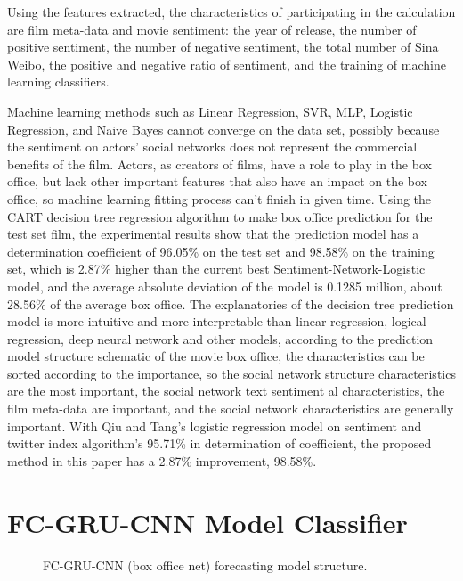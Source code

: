 \documentclass[review]{cvpr}
\begin{document}
Using the features extracted, the characteristics of participating in the calculation are film meta-data and movie sentiment: the year of release, the number of positive sentiment, the number of negative sentiment, the total number of Sina Weibo, the positive and negative ratio of sentiment, and the training of machine learning classifiers.

Machine learning methods such as Linear Regression, SVR, MLP, Logistic Regression, and Naive Bayes cannot converge on the data set, possibly because the sentiment on actors' social networks does not represent the commercial benefits of the film.
Actors, as creators of films, have a role to play in the box office, but lack other important features that also have an impact on the box office, so machine learning fitting process can't finish in given time.
Using the CART decision tree regression algorithm to make box office prediction for the test set film, 
the experimental results show that the prediction model has a determination coefficient of 96.05\% on the test set and 98.58\% on the training set, which is 2.87\% higher than the current best Sentiment-Network-Logistic model, 
and the average absolute deviation of the model is 0.1285 million, about 28.56\% of the average box office.
The explanatories of the decision tree prediction model is more intuitive and more interpretable than linear regression, logical regression, deep neural network and other models, according to the prediction model structure schematic of the movie box office, 
the characteristics can be sorted according to the importance, so the social network structure characteristics are the most important, the social network text sentiment al characteristics, the film meta-data are important, and the social network characteristics are generally important.
With Qiu and Tang's logistic regression model on sentiment and twitter index algorithm's 95.71\% in determination of coefficient, the proposed method in this paper has a 2.87\% improvement, 98.58\%.

\section{FC-GRU-CNN Model Classifier}


\begin{figure*}
\begin{center}
\end{center}
   \caption{FC-GRU-CNN (box office net) forecasting model structure.}
\label{fig:short}
\end{figure*}
\end{document}
